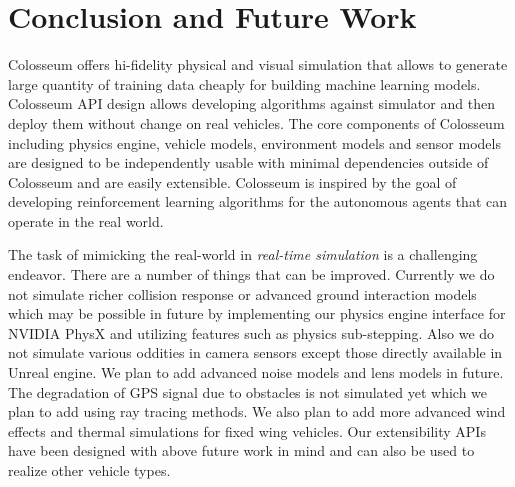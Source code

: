 \documentclass[graybox]{svmult}
\begin{document}
	
	\section{Conclusion and Future Work}
	Colosseum offers hi-fidelity physical and visual simulation that allows to generate large quantity of training data cheaply for building machine learning models. Colosseum API design allows developing algorithms against simulator and then deploy them without change on real vehicles. The core components of Colosseum including physics engine, vehicle models, environment models and sensor models are designed to be independently usable with minimal dependencies outside of Colosseum and are easily extensible. Colosseum is inspired by the goal of developing reinforcement learning algorithms for the autonomous agents that can operate in the real world.
	
	The task of mimicking the real-world in \emph{real-time simulation} is a challenging endeavor. There are a number of things that can be improved. Currently we do not simulate richer collision response or advanced ground interaction models which may be possible in future by implementing our physics engine interface for NVIDIA PhysX and utilizing features such as physics sub-stepping. Also we do not simulate various oddities in camera sensors except those directly available in Unreal engine. We plan to add advanced noise models and lens models in future. The degradation of GPS signal due to obstacles is not simulated yet which we plan to add using ray tracing methods. We also plan to add more advanced wind effects and thermal simulations for fixed wing vehicles. Our extensibility APIs have been designed with above future work in mind and can also be used to realize other vehicle types.
	
	
	{\footnotesize 
		}
	
\end{document}
